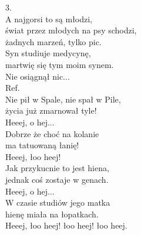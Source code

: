 \begin{text}
3.\\
A najgorsi to są młodzi,\\
świat przez młodych na psy schodzi,\\
żadnych marzeń, tylko pic.\\
Syn studiuje medycynę,\\
martwię się tym moim synem.\\
Nie osiągnął nic...\\

Ref.\\
Nie pił w Spale, nie spał w Pile,\\
życia już zmarnował tyle!\\
Heeej, o hej...\\
Dobrze że choć na kolanie\\
ma tatuowaną łanię!\\
Heeej, łoo heej!\\
Jak przykucnie to jest hiena,\\
jednak coś zostaje w genach.\\
Heeej, o hej... \\
W czasie studiów jego matka\\
hienę miała na łopatkach.\\
Heeej, łoo heej! łoo heej! łoo heej.\\
\end{text}